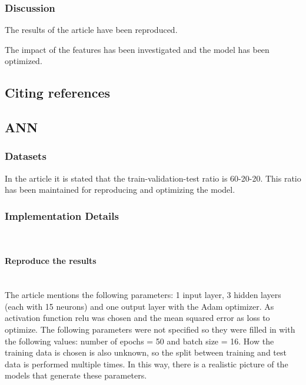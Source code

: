 \documentclass{article}
\newcommand{\subsubsubsection}[1]{%
  \paragraph{#1}\mbox{}\\}
\begin{document}
\subsubsection{Discussion}
The results of the article have been reproduced.

The impact of the features has been investigated and the model has been optimized.


\subsection{Citing references}

\subsection{ANN}

\subsubsection{Datasets}
In the article \cite{dahal2021prediction} it is stated that the train-validation-test ratio is 60-20-20. This ratio has been maintained for reproducing and optimizing the model.

\subsubsection{Implementation Details}

\subsubsubsection{Reproduce the results}
The article \cite{dahal2021prediction} mentions the following parameters: 1 input layer, 3 hidden layers (each with 15 neurons) and one output layer with the Adam optimizer.
As activation function relu was chosen and the mean squared error as loss to optimize. The following parameters were not specified so they were filled in with the following values: number of epochs = 50 and batch size = 16.
How the training data is chosen is also unknown, so the split between training and test data is performed multiple times. In this way, there is a realistic picture of the models that generate these parameters. 
\end{document}
